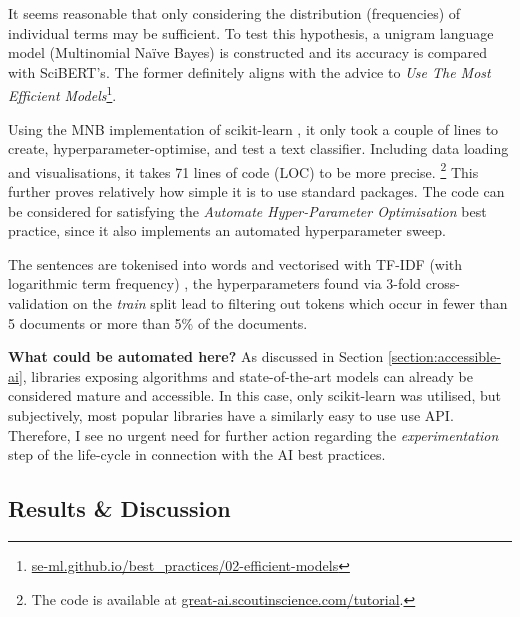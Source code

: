 It seems reasonable that only considering the distribution (frequencies) of individual terms may be sufficient. To test this hypothesis, a unigram language model (Multinomial Naïve Bayes) is constructed and its accuracy is compared with SciBERT's. The former definitely aligns with the advice to \textit{Use The Most Efficient Models}\footnote{\href{https://se-ml.github.io/best_practices/02-efficient-models/}{se-ml.github.io/best\_practices/02-efficient-models}}.

Using the MNB implementation of scikit-learn \cite{pedregosa2011scikit}, it only took a couple of lines to create, hyperparameter-optimise, and test a text classifier. Including data loading and visualisations, it takes 71 lines of code (LOC) to be more precise. \footnote{The code is available at \href{https://great-ai.scoutinscience.com/tutorial/}{great-ai.scoutinscience.com/tutorial}.} This further proves relatively how simple it is to use standard packages. The code can be considered for satisfying the \textit{Automate Hyper-Parameter Optimisation} best practice, since it also implements an automated hyperparameter sweep. 

The sentences are tokenised into words and vectorised with TF-IDF (with logarithmic term frequency) \cite{buckley1985implementation}, the hyperparameters found via 3-fold cross-validation on the \textit{train} split lead to filtering out tokens which occur in fewer than 5 documents or more than 5\% of the documents.

\begin{displayquote}
\textbf{What could be automated here?} As discussed in Section \ref{section:accessible-ai}, libraries exposing algorithms and state-of-the-art models can already be considered mature and accessible. In this case, only scikit-learn was utilised, but subjectively, most popular libraries have a similarly easy to use use API. Therefore, I see no urgent need for further action regarding the \textit{experimentation} step of the life-cycle in connection with the AI best practices.
\end{displayquote}

\subsection{Results \& Discussion}


